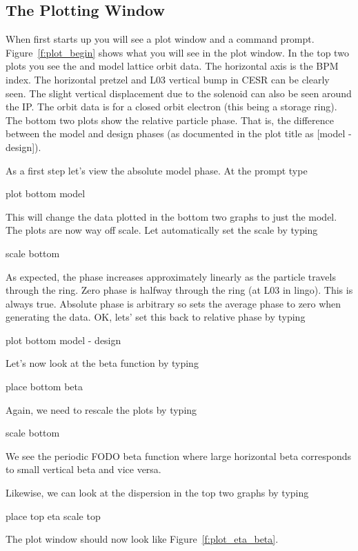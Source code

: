 \subsection{The Plotting Window}

When \tao first starts up you will see a plot window and a command prompt. 
Figure~\ref{f:plot_begin} shows what you will see in the plot window. In the top
two plots you see the  and  model lattice orbit data. The horizontal
axis is the \cesr BPM index. The horizontal pretzel and L03 vertical bump in
CESR can be clearly 
seen. The slight vertical displacement due to the solenoid can also be seen around 
the IP. The orbit data is for a closed orbit electron (this being a storage
ring). The bottom two plots show the relative 
particle phase. That is, the difference
between the model and design phases (as documented in the plot title as [model -
design]). 

As a first step let's view the absolute model phase. At the  prompt type
\begin{example}
  plot bottom model
\end{example}
This will change the data plotted in the bottom two graphs to just the model.
The plots are now way off scale. Let \tao automatically set the scale by typing
\begin{example}
  scale bottom
\end{example}
As expected, the phase increases approximately linearly as the particle travels
through the ring. Zero phase is halfway through the ring (at L03 in \cesr lingo).
This is always true. Absolute phase is arbitrary so \tao sets the average
phase to zero when generating the data. OK, lets' set this back to relative
phase by typing
\begin{example}
  plot bottom model - design
\end{example}


Let's now look at the beta function by typing
\begin{example}
  place bottom beta
\end{example}
Again, we need to rescale the plots by typing
\begin{example}
  scale bottom
\end{example}
We see the periodic FODO beta function where large horizontal beta corresponds to
small vertical beta and vice versa.

Likewise, we can look at the dispersion in the top two graphs by typing
\begin{example}
  place top eta
  scale top
\end{example}
The plot window should now look like Figure~\ref{f:plot_eta_beta}.

